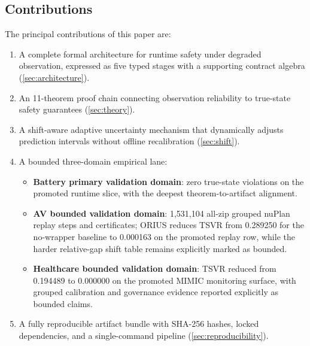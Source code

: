 \subsection{Contributions}

The principal contributions of this paper are:

\begin{enumerate}[nosep]
  \item A complete formal architecture for runtime safety under degraded observation,
        expressed as five typed stages with a supporting contract algebra
        (\cref{sec:architecture}).
  \item An 11-theorem proof chain connecting observation reliability to true-state
        safety guarantees (\cref{sec:theory}).
  \item A shift-aware adaptive uncertainty mechanism that dynamically adjusts
        prediction intervals without offline recalibration (\cref{sec:shift}).
  \item A bounded three-domain empirical lane:
        \begin{itemize}[nosep]
          \item \textbf{Battery primary validation domain}: zero true-state violations on the promoted
                runtime slice, with the deepest theorem-to-artifact alignment.
          \item \textbf{AV bounded validation domain}: 1{,}531{,}104 all-zip grouped nuPlan replay
                steps and certificates; ORIUS reduces TSVR from 0.289250 for the
                no-wrapper baseline to 0.000163 on the promoted replay row, while the
                harder relative-gap shift table remains explicitly marked as bounded.
          \item \textbf{Healthcare bounded validation domain}: TSVR reduced from 0.194489 to 0.000000 on
                the promoted MIMIC monitoring surface, with grouped calibration and
                governance evidence reported explicitly as bounded claims.
        \end{itemize}
  \item A fully reproducible artifact bundle with SHA-256 hashes, locked
        dependencies, and a single-command pipeline (\cref{sec:reproducibility}).
\end{enumerate}

